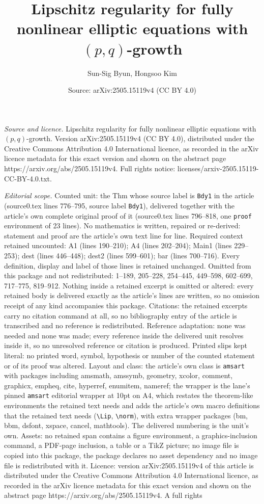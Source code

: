 \documentclass[10pt,a4paper]{amsart}
\title[Lipschitz regularity for fully nonlinear elliptic equations ]{Lipschitz regularity for fully nonlinear elliptic equations with $(p,q)$-growth}
\author{Sun-Sig Byun, Hongsoo Kim}
\date{Source: arXiv:2505.15119v4 (CC BY 4.0)}
\begin{document}
\maketitle

\noindent\emph{Source and licence.} Lipschitz regularity for fully nonlinear elliptic equations with $(p,q)$-growth. Version arXiv:2505.15119v4 (CC BY 4.0), distributed under the Creative Commons Attribution 4.0 International licence, as recorded in the arXiv licence metadata for this exact version and shown on the abstract page https://arxiv.org/abs/2505.15119v4. Full rights notice: licenses/arxiv-2505.15119-CC-BY-4.0.txt.\par\smallskip

\noindent\textit{Editorial scope.} Counted unit: the Thm whose source label is \texttt{Bdy1} in the article (source0.tex lines 776--795, source label \texttt{Bdy1}), delivered together with the article's own complete original proof of it (source0.tex lines 796--818, one \texttt{proof} environment of 23 lines). No mathematics is written, repaired or re-derived: statement and proof are the article's own text line for line. Required context retained uncounted: A1 (lines 190--210); A4 (lines 202--204); Main1 (lines 229--253); dest (lines 446--448); dest2 (lines 599--601); bar (lines 700--716). Every definition, display and label of those lines is retained unchanged. Omitted from this package and not redistributed: 1--189, 205--228, 254--445, 449--598, 602--699, 717--775, 819--912. Nothing inside a retained excerpt is omitted or altered: every retained body is delivered exactly as the article's lines are written, so no omission receipt of any kind accompanies this package. Citations: the retained excerpts carry no citation command at all, so no bibliography entry of the article is transcribed and no reference is redistributed. Reference adaptation: none was needed and none was made; every reference inside the delivered unit resolves inside it, so no unresolved reference or citation is produced. Printed slips kept literal: no printed word, symbol, hypothesis or number of the counted statement or of its proof was altered. Layout and class: the article's own class is \texttt{amsart} with packages including amsmath, amssymb, geometry, xcolor, comment, graphicx, empheq, cite, hyperref, enumitem, nameref; the wrapper is the lane's pinned \texttt{amsart} editorial wrapper at 10pt on A4, which restates the theorem-like environments the retained text needs and adds the article's own macro definitions that the retained text needs (\texttt{\textbackslash Lip}, \texttt{\textbackslash norm}), with extra wrapper packages (bm, bbm, dsfont, xspace, cancel, mathtools). The delivered numbering is the unit's own. Assets: no retained span contains a figure environment, a graphics-inclusion command, a PDF-page inclusion, a table or a TikZ picture; no image file is copied into this package, the package declares no asset dependency and no image file is redistributed with it. Licence: version arXiv:2505.15119v4 of this article is distributed under the Creative Commons Attribution 4.0 International licence, as recorded in the arXiv licence metadata for this exact version and shown on the abstract page https://arxiv.org/abs/2505.15119v4. A full rights 
\end{document}
